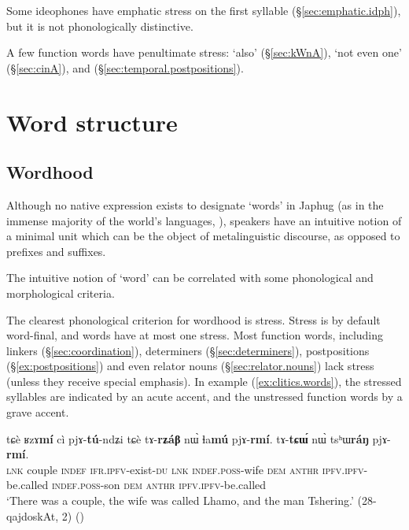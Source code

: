 Some ideophones have emphatic stress on the first syllable (§\ref{sec:emphatic.idph}), but it is not phonologically distinctive.

A few function words have penultimate stress:  `also' (§\ref{sec:kWnA}),  `not even one' (§\ref{sec:cinA}),  and  (§\ref{sec:temporal.postpositions}). 

\section{Word structure}  

\subsection{Wordhood} \label{sec:wordhood}
Although no native expression exists to designate `words' in Japhug (as in the immense majority of the world's languages, \citealt{dixon02word}), speakers have an intuitive notion of a minimal unit  which can be the object of metalinguistic discourse, as opposed to prefixes and suffixes.

The intuitive notion of `word' can be correlated with some phonological and morphological criteria.

The clearest phonological criterion for wordhood is stress. Stress is by default word-final, and words have at most one stress. Most function words, including linkers (§\ref{sec:coordination}), determiners (§\ref{sec:determiners}), postpositions (§\ref{ex:postpositions}) and even relator nouns (§\ref{sec:relator.nouns}) lack stress (unless they receive special emphasis). In example (\ref{ex:clitics.words}), the stressed syllables are indicated by an acute accent, and the unstressed function words by a grave accent.

\begin{exe}
	\ex \label{ex:clitics.words}
	\gll  tɕè ʁzɤ\textbf{mí} cì pjɤ-\textbf{tú}-ndʑi tɕè tɤ-\textbf{rʑáβ} nɯ̀ ɬa\textbf{mú} pjɤ-\textbf{rmí}. tɤ-\textbf{tɕɯ́} nɯ̀ tsʰɯ\textbf{ráŋ} pjɤ-\textbf{rmí}. \\
	\textsc{lnk} couple \textsc{indef} \textsc{ifr}.\textsc{ipfv}-exist-\textsc{du} \textsc{lnk} \textsc{indef}.\textsc{poss}-wife \textsc{dem}  \textsc{anthr} \textsc{ipfv}.\textsc{ipfv}-be.called \textsc{indef}.\textsc{poss}-son \textsc{dem}   \textsc{anthr} \textsc{ipfv}.\textsc{ipfv}-be.called  \\
	\glt `There was a couple, the wife was called Lhamo, and the man Tshering.' (28-qajdoskAt, 2)
	()
\end{exe}

